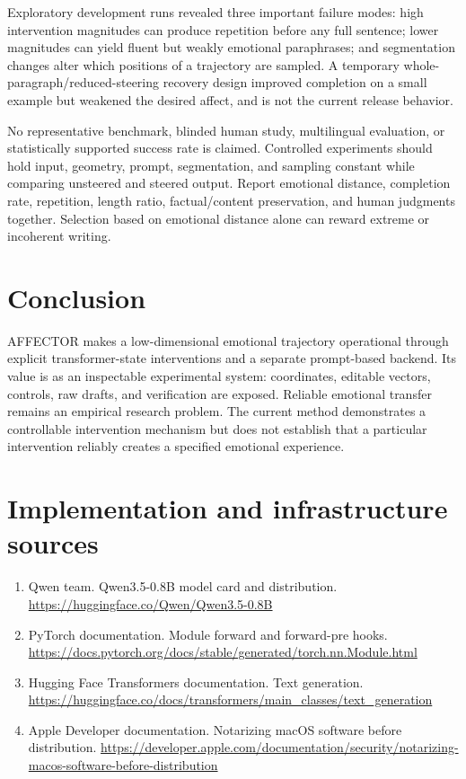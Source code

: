 \documentclass[manuscript,screen,nonacm]{acmart}
\begin{document}
Exploratory development runs revealed three important failure modes:
high intervention magnitudes can produce repetition before any full
sentence; lower magnitudes can yield fluent but weakly emotional
paraphrases; and segmentation changes alter which positions of a
trajectory are sampled. A temporary whole-paragraph/reduced-steering
recovery design improved completion on a small example but weakened the
desired affect, and is not the current release behavior.

No representative benchmark, blinded human study, multilingual
evaluation, or statistically supported success rate is claimed.
Controlled experiments should hold input, geometry, prompt,
segmentation, and sampling constant while comparing unsteered and
steered output. Report emotional distance, completion rate, repetition,
length ratio, factual/content preservation, and human judgments
together. Selection based on emotional distance alone can reward extreme
or incoherent writing.

\section{Conclusion}\label{conclusion}

AFFECTOR makes a low-dimensional emotional trajectory operational
through explicit transformer-state interventions and a separate
prompt-based backend. Its value is as an inspectable experimental
system: coordinates, editable vectors, controls, raw drafts, and
verification are exposed. Reliable emotional transfer remains an
empirical research problem. The current method demonstrates a
controllable intervention mechanism but does not establish that a
particular intervention reliably creates a specified emotional
experience.

\section{Implementation and infrastructure
sources}\label{implementation-and-infrastructure-sources}

\begin{enumerate}
\def\labelenumi{\arabic{enumi}.}
\item
  Qwen team. Qwen3.5-0.8B model card and distribution.
  \url{https://huggingface.co/Qwen/Qwen3.5-0.8B}
\item
  PyTorch documentation. Module forward and forward-pre hooks.
  \url{https://docs.pytorch.org/docs/stable/generated/torch.nn.Module.html}
\item
  Hugging Face Transformers documentation. Text generation.
  \url{https://huggingface.co/docs/transformers/main_classes/text_generation}
\item
  Apple Developer documentation. Notarizing macOS software before
  distribution.
  \url{https://developer.apple.com/documentation/security/notarizing-macos-software-before-distribution}
\end{enumerate}
\end{document}
